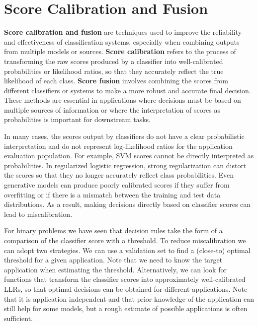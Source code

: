 
\setlength{\parindent}{0pt}
\setlength{\parskip}{0.7em}

\section*{Score Calibration and Fusion}

\textbf{Score calibration and fusion} are techniques used to improve the reliability and effectiveness of classification systems, especially when combining outputs from multiple models or sources. \textbf{Score calibration} refers to the process of transforming the raw scores produced by a classifier into well-calibrated probabilities or likelihood ratios, so that they accurately reflect the true likelihood of each class. \textbf{Score fusion} involves combining the scores from different classifiers or systems to make a more robust and accurate final decision. These methods are essential in applications where decisions must be based on multiple sources of information or where the interpretation of scores as probabilities is important for downstream tasks.

In many cases, the scores output by classifiers do not have a clear probabilistic interpretation and do not represent log-likelihood ratios for the application evaluation population. For example, SVM scores cannot be directly interpreted as probabilities. In regularized logistic regression, strong regularization can distort the scores so that they no longer accurately reflect class probabilities. Even generative models can produce poorly calibrated scores if they suffer from overfitting or if there is a mismatch between the training and test data distributions. As a result, making decisions directly based on classifier scores can lead to miscalibration.

For binary problems we have seen that decision rules take the form of a comparison of the classifier score with a threshold. To reduce miscalibration we can adopt two strategies. We can use a validation set to find a (close-to) optimal threshold for a given application. Note that we need to know the target application when estimating the threshold. Alternatively, we can look for functions that transform the classifier scores into approximately well-calibrated LLRs, so that optimal decisions can be obtained for different applications. Note that it is application independent and that prior knowledge of the application can still help for some models, but a rough estimate of possible applications is often sufficient.

